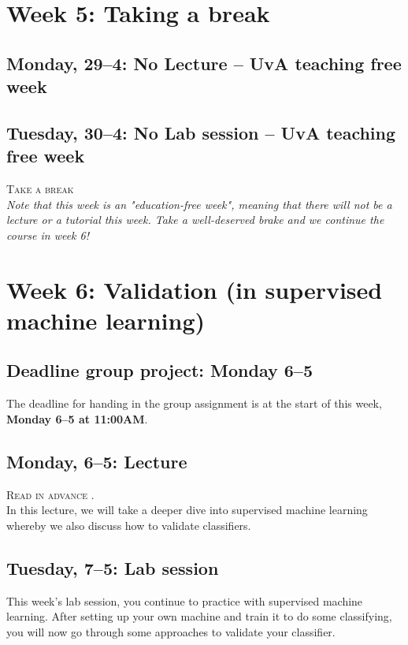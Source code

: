 \section*{Week 5: Taking a break}

\subsection*{Monday, 29--4: No Lecture -- UvA teaching free week}
\subsection*{Tuesday, 30--4: No Lab session -- UvA teaching free week}

\textsc{ Take a break}\\

\emph{Note that this week is an "education-free week", meaning that there will not be a lecture or a tutorial this week. Take a well-deserved brake and we continue the course in week 6!}

\section*{Week 6: Validation (in supervised machine learning)}

\subsection*{Deadline group project: Monday 6--5}
The deadline for handing in the group assignment is at the start of this week, \textbf{Monday 6--5 at 11:00AM}.

\subsection*{Monday, 6--5: Lecture}
\textsc{ Read in advance \cite{birkenmaier_search_2023}.}\\

In this lecture, we will take a deeper dive into supervised machine learning whereby we also discuss how to validate classifiers.

\subsection*{Tuesday, 7--5: Lab session}
This week's lab session, you continue to practice with supervised machine learning. After setting up your own machine and train it to do some classifying, you will now go through some approaches to validate your classifier.

